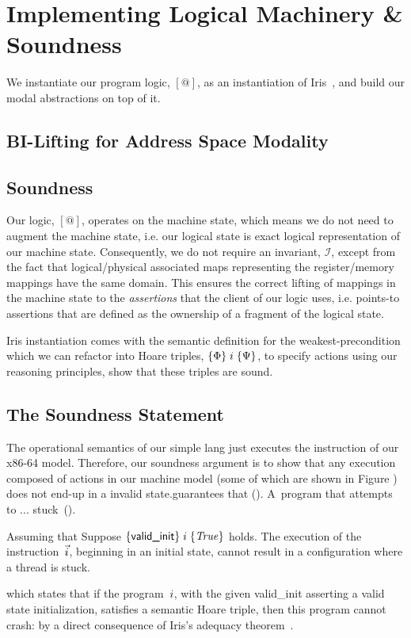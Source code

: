 \section{Implementing Logical Machinery \& Soundness}
We instantiate our program logic, $[@]$, as an instantiation of Iris~\cite{iris}, and build our modal abstractions on top of it. 
\subsection{BI-Lifting for Address Space Modality}
\label{sec:bilifting}
\subsection{Soundness}
\label{sec:soundness}
Our logic, $[@]$, operates on the machine state, which means we do not need to augment the machine state, i.e. our logical state is exact logical representation of our machine state. Consequently, we do not require an invariant, $\mathcal{I}$, except from the fact that logical/physical associated maps representing the register/memory mappings have the same domain. This ensures the correct lifting of mappings in the machine state to the \emph{assertions} that the client of our logic uses, i.e. points-to assertions that are defined as the ownership of a fragment of the logical state.

Iris instantiation comes with the semantic definition for the weakest-precondition which we can refactor into Hoare triples, $\{\Phi\}\;i\;\{\Psi\}$, to specify actions using our reasoning principles, show that these triples are sound.

\subsection{The Soundness Statement}
\label{def:soundness:statement}
The operational semantics of our simple lang just executes the instruction of our x86-64 model. Therefore, our soundness argument is to show that any execution composed of actions in our machine model (some of which are shown in Figure ) does not end-up in a invalid state.guarantees that  (). A~program that attempts to ... stuck~().
\begin{theorem}
  \label{th:adequacy}
  Assuming that  Suppose $\{\textsf{valid\_init}\}\;i\;\{\mathit{True}\}$ holds.
 The execution of the instruction~$\vec{i}$, beginning in an initial state, cannot result in a configuration where a thread is stuck.
\end{theorem}
which states that if the program~$i$, with the given \textsf{valid\_init} asserting a valid state initialization, satisfies a semantic Hoare
triple, then this program cannot crash: by a direct consequence of Iris's adequacy theorem~\cite[\S6.4]{iris}.

